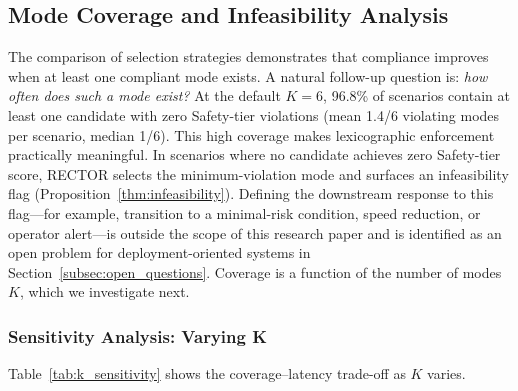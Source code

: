 \subsection{Mode Coverage and Infeasibility Analysis}
\label{subsec:mode_coverage}

The comparison of selection strategies demonstrates that compliance improves when at least one compliant mode exists.  A natural follow-up question is: \emph{how often does such a mode exist?}  At the default $K{=}6$, 96.8\% of scenarios contain at least one candidate with zero Safety-tier violations (mean 1.4/6 violating modes per scenario, median 1/6).  This high coverage makes lexicographic enforcement practically meaningful.  In scenarios where no candidate achieves zero Safety-tier score, RECTOR selects the minimum-violation mode and surfaces an infeasibility flag (Proposition~\ref{thm:infeasibility}).  Defining the downstream response to this flag---for example, transition to a minimal-risk condition, speed reduction, or operator alert---is outside the scope of this research paper and is identified as an open problem for deployment-oriented systems in Section~\ref{subsec:open_questions}.  Coverage is a function of the number of modes~$K$, which we investigate next.

\subsubsection{Sensitivity Analysis: Varying K}
\label{subsubsec:k_sensitivity}

Table~\ref{tab:k_sensitivity} shows the coverage--latency trade-off as $K$ varies.

